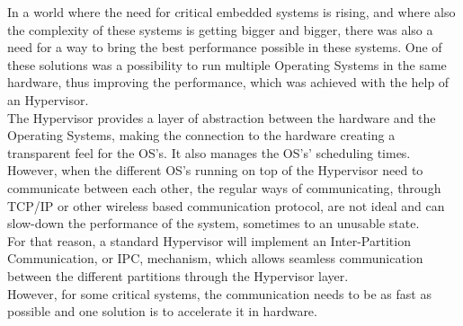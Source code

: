 In a world where the need for critical embedded systems is rising, and where also the complexity of these systems is getting bigger and bigger, there was also a need for a way to bring the best performance possible in these systems. One of these solutions was a possibility to run multiple Operating Systems in the same hardware, thus improving the performance, which was achieved with the help of an Hypervisor.\\
\indent The Hypervisor provides a layer of abstraction between the hardware and the Operating Systems, making the connection to the hardware creating a transparent feel for the OS’s. It also manages the OS’s’ scheduling times. However, when the different OS’s running on top of the Hypervisor need to communicate between each other, the regular ways of communicating, through TCP/IP or other wireless based communication protocol, are not ideal and can slow-down the performance of the system, sometimes to an unusable state.\\
\indent For that reason, a standard Hypervisor will implement an Inter-Partition Communication, or IPC, mechanism, which allows seamless communication between the different partitions through the Hypervisor layer.\\
\indent However, for some critical systems, the communication needs to be as fast as possible and one solution is to accelerate it in hardware.
